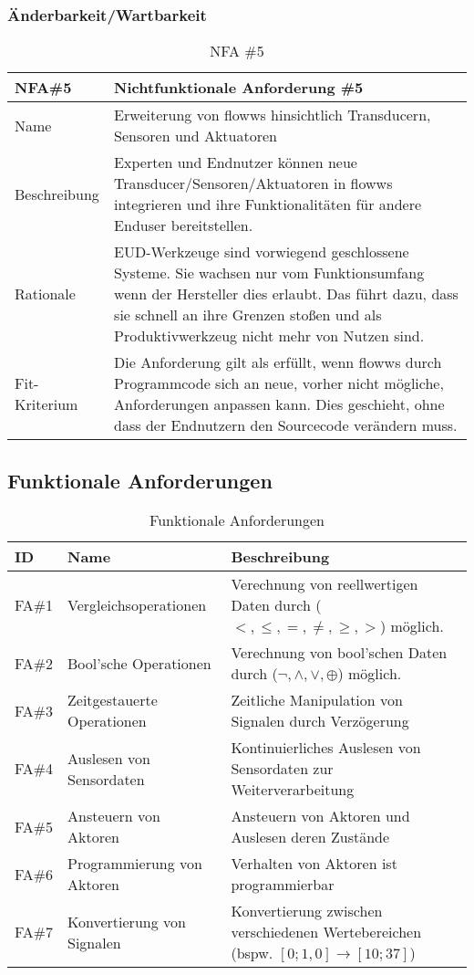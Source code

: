 \subsubsection{Änderbarkeit/Wartbarkeit}
\begin{table}[H]
\caption{NFA \#5}
\label{tab:NFA5}
\begin{tabularx}{\textwidth}{lX}
\hline
\rowcolor[HTML]{EFEFEF} 
NFA\#5        & Nichtfunktionale Anforderung \#5 \\ \hline
Name          & Erweiterung von flowws hinsichtlich Transducern, Sensoren und Aktuatoren \\ \hline
Beschreibung  & Experten und Endnutzer können neue Transducer/Sensoren/Aktuatoren in flowws integrieren und ihre Funktionalitäten für andere Enduser bereitstellen. \\ \hline
Rationale     & \ac{EUD}-Werkzeuge sind vorwiegend geschlossene Systeme. Sie wachsen nur vom Funktionsumfang wenn der Hersteller dies erlaubt. Das führt dazu, dass sie schnell an ihre Grenzen stoßen und als Produktivwerkzeug nicht mehr von Nutzen sind. \\ \hline
Fit-Kriterium & Die Anforderung gilt als erfüllt, wenn flowws durch Programmcode sich an neue, vorher nicht mögliche, Anforderungen anpassen kann. Dies geschieht, ohne dass der Endnutzern den Sourcecode verändern muss. \\ \hline
\end{tabularx}
\end{table}

\subsection{Funktionale Anforderungen}\label{subsec:fanf}
\begin{table}[h]
\caption{Funktionale Anforderungen}
\label{tab:fanf}
\begin{tabularx}{\textwidth}{llX}
\hline
\rowcolor[HTML]{EFEFEF}
ID    & Name                       & Beschreibung \\ \hline
FA\#1 & Vergleichsoperationen      & Verechnung von reellwertigen Daten durch ($<,\leq,=,\neq,\geq,>$) möglich. \\ \hline
FA\#2 & Bool'sche Operationen      & Verechnung von bool'schen Daten durch ($\neg, \land, \lor, \oplus$) möglich. \\ \hline
FA\#3 & Zeitgestauerte Operationen & Zeitliche Manipulation von Signalen durch Verzögerung \\ \hline
FA\#4 & Auslesen von Sensordaten   & Kontinuierliches Auslesen von Sensordaten zur Weiterverarbeitung \\ \hline
FA\#5 & Ansteuern von Aktoren      & Ansteuern von Aktoren und Auslesen deren Zustände \\ \hline
FA\#6 & Programmierung von Aktoren & Verhalten von Aktoren ist programmierbar \\ \hline
FA\#7 & Konvertierung von Signalen & Konvertierung zwischen verschiedenen Wertebereichen (bspw. $\left [ 0;1,0 \right ] \rightarrow \left [ 10;37 \right ]$) \\ \hline
\end{tabularx}
\end{table}